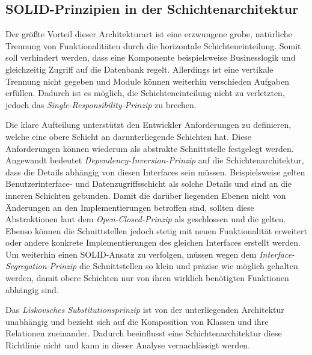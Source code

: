 \documentclass[conference]{IEEEtran}
\begin{document}
\subsection{SOLID-Prinzipien in der Schichtenarchitektur}

Der größte Vorteil dieser Architekturart ist eine erzwungene grobe, natürliche Trennung von Funktionalitäten durch die horizontale Schichteneinteilung. Somit soll verhindert werden, dass eine Komponente beispielsweise Businesslogik und gleichzeitig Zugriff auf die Datenbank regelt. Allerdings ist eine vertikale Trennung nicht gegeben und Module können weiterhin verschieden Aufgaben erfüllen. Dadurch ist es möglich, die Schichteneinteilung nicht zu verletzten, jedoch das \emph{Single-Responsibility-Prinzip} zu brechen.

Die klare Aufteilung unterstützt den Entwickler Anforderungen zu definieren, welche eine obere Schicht an darunterliegende Schichten hat. Diese Anforderungen können wiederum als abstrakte Schnittstelle festgelegt werden. Angewandt bedeutet \emph{Dependency-Inversion-Prinzip} auf die Schichtenarchitektur, dass die Details abhängig von diesen Interfaces sein müssen. Beispielsweise gelten Benutzerinterface- und Datenzugriffsschicht als solche Details und sind an die inneren Schichten gebunden. Damit die darüber liegenden Ebenen nicht von Änderungen an den Implementierungen betroffen sind, sollten diese Abstraktionen laut dem \emph{Open-Closed-Prinzip} als geschlossen und die gelten. Ebenso können die Schnittstellen jedoch stetig mit neuen Funktionalität erweitert oder andere konkrete Implementierungen des gleichen Interfaces erstellt werden. Um weiterhin einen SOLID-Ansatz zu verfolgen, müssen wegen dem \emph{Interface-Segregation-Prinzip} die Schnittstellen so klein und präzise wie möglich gehalten werden, damit obere Schichten nur von ihren wirklich benötigten Funktionen abhängig sind.

Das \emph{Liskovsches Substitutionsprinzip} ist von der unterliegenden Architektur unabhängig und bezieht sich auf die Komposition von Klassen und ihre Relationen zueinander. Dadurch beeinflusst eine Schichtenarchitektur diese Richtlinie nicht und kann in dieser Analyse vernachlässigt werden.




\end{document}
